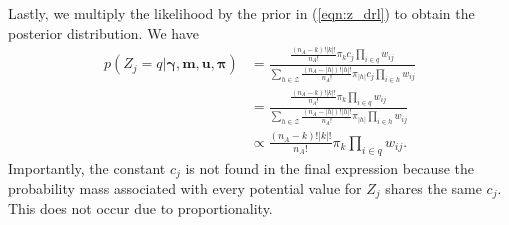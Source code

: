 \documentclass[12pt,letterpaper]{article}
\newcommand{\1}[1]{\mathbb{I}\!\left[#1\right]} %
\begin{document}
Lastly, we multiply the likelihood by the prior in (\ref{eqn:z_drl}) to obtain the posterior distribution. We have
	\begin{align}
		p\left(Z_j  = q|\bm{\gamma}, \bm{m}, \bm{u}, \bm{\pi} \right) &= \frac{\frac{(n_A - k)!|k|!}{n_A!} \pi_{k} c_j \prod_{i \in q} w_{ij}}{\sum_{h \in \mathcal{Z}} \frac{(n_A - |h|)!|h|!}{n_A!} \pi_{|h|} c_j \prod_{i \in h} w_{ij}} \\
		&= \frac{\frac{(n_A - k)!|k|!}{n_A!} \pi_{k} \prod_{i \in q} w_{ij}}{\sum_{h \in \mathcal{Z}} \frac{(n_A - |h|)!|h|!}{n_A!} \pi_{|h|} \prod_{i \in h} w_{ij}} \\
		&\propto \frac{(n_A - k)!|k|!}{n_A!} \pi_{k} \prod_{i \in q} w_{ij}.
	\end{align}
Importantly, the constant $c_j$ is not found in the final expression because the probability mass associated with every potential value for $Z_j$ shares the same $c_j$. This does not occur due to proportionality.
\end{document}
